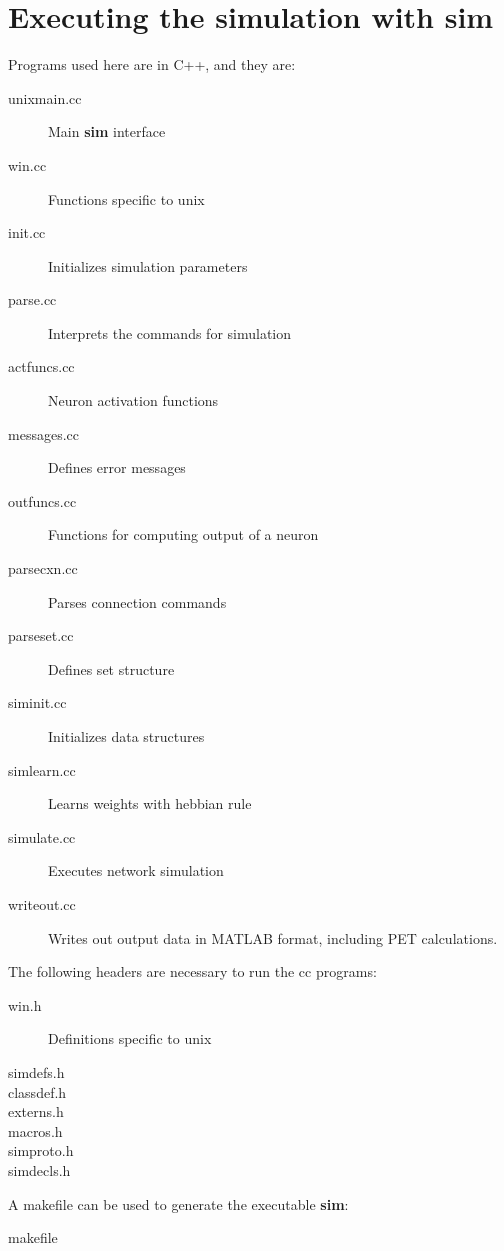 \documentclass[12pt]{article}
\begin{document}
\section{Executing the simulation with sim}
Programs used here are in C++, and they are:
\begin{description}
  \item[unixmain.cc] Main {\bf sim} interface
  \item[win.cc] Functions specific to unix
  \item[init.cc] Initializes simulation parameters
  \item[parse.cc] Interprets the commands for simulation
  \item[actfuncs.cc] Neuron activation functions
  \item[messages.cc] Defines error messages
  \item[outfuncs.cc] Functions for computing output of a neuron
  \item[parsecxn.cc] Parses connection commands
  \item[parseset.cc] Defines set structure
  \item[siminit.cc] Initializes data structures
  \item[simlearn.cc] Learns weights with hebbian rule
  \item[simulate.cc] Executes network simulation
  \item[writeout.cc] Writes out output data in MATLAB format,
                     including PET calculations.
\end{description}
The following headers are necessary to run the cc programs:
\begin{description}
  \item[win.h] Definitions specific to unix
  \item[simdefs.h]
  \item[classdef.h]
  \item[externs.h]
  \item[macros.h]
  \item[simproto.h]
  \item[simdecls.h]
\end{description}
A makefile can be used to generate the executable {\bf sim}:
\begin{description}
  \item[makefile]
\end{description}

\end{document}

